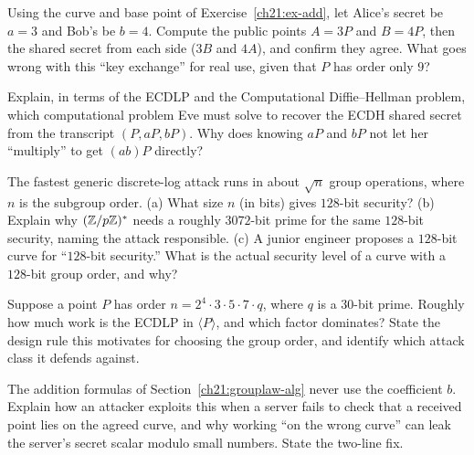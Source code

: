 \begin{exercise}
\label{ch21:ex-ecdh}
Using the curve and base point of Exercise~\ref{ch21:ex-add}, let Alice's secret be
$a=3$ and Bob's be $b=4$. Compute the public points $A=3P$ and $B=4P$, then the shared
secret from each side ($3B$ and $4A$), and confirm they agree. What goes wrong with this
``key exchange'' for real use, given that $P$ has order only $9$?
\end{exercise}

\begin{exercise}
\label{ch21:ex-eve}
Explain, in terms of the ECDLP and the Computational Diffie--Hellman problem, which
computational problem Eve must solve to recover the ECDH shared secret from the
transcript $(P, aP, bP)$. Why does knowing $aP$ and $bP$ not let her ``multiply'' to get
$(ab)P$ directly?
\end{exercise}

\begin{exercise}
\label{ch21:ex-keysize}
The fastest generic discrete-log attack runs in about $\sqrt n$ group operations, where
$n$ is the subgroup order. (a) What size $n$ (in bits) gives $128$-bit security?
(b) Explain why $(\mathbb{Z}/p\mathbb{Z})^{*}$ needs a roughly $3072$-bit prime for the same $128$-bit
security, naming the attack responsible. (c) A junior engineer proposes a $128$-bit curve
for ``$128$-bit security.'' What is the actual security level of a curve with a $128$-bit
group order, and why?
\end{exercise}

\begin{exercise}
\label{ch21:ex-pohlig}
Suppose a point $P$ has order $n = 2^4 \cdot 3 \cdot 5 \cdot 7 \cdot q$, where $q$ is a
$30$-bit prime. Roughly how much work is the ECDLP in $\langle P\rangle$, and which factor
dominates? State the design rule this motivates for choosing the group order, and identify
which attack class it defends against.
\end{exercise}

\begin{exercise}
\label{ch21:ex-invalid}
The addition formulas of Section~\ref{ch21:grouplaw-alg} never use the coefficient $b$.
Explain how an attacker exploits this when a server fails to check that a received point
lies on the agreed curve, and why working ``on the wrong curve'' can leak the server's
secret scalar modulo small numbers. State the two-line fix.
\end{exercise}

